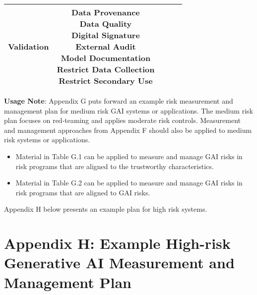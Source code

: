 \documentclass[fleqn]{article}
\begin{document}
\begin{landscape}
\begin{table}[H]
\begin{tabular}{|c|c|c|c|c|}
{			\textbullet\hspace{3pt} Validation\\ 	
		}
		& \makecell[l]{
			\textbullet\hspace{3pt} Data Provenance\\ 	
			\textbullet\hspace{3pt} Data Quality\\ 	
			\textbullet\hspace{3pt} Digital Signature\\ 	
			\textbullet\hspace{3pt} External Audit\\ 	
			\textbullet\hspace{3pt} Model Documentation \\ 
			\textbullet\hspace{3pt} Restrict Data Collection\\ 				
			\textbullet\hspace{3pt} Restrict Secondary Use\\ 							 	 
		} 
		\\
		\hline
	\end{tabular}
	\label{table:med_risk_plan_by_gai_risk_cont2}
\end{table}

\noindent\textbf{Usage Note}: Appendix G puts forward an example risk measurement and management plan for medium risk GAI systems or applications. The medium risk plan focuses on red-teaming and applies moderate risk controls. Measurement and management approaches from Appendix F should also be applied to medium risk systems or applications.

\begin{itemize}
	\item Material in Table G.1 can be applied to measure and manage GAI risks in risk programs that are aligned to the trustworthy characteristics. 
	\item Material in Table G.2 can be applied to measure and manage GAI risks in risk programs that are aligned to GAI risks. 
\end{itemize}

\noindent Appendix H below presents an example plan for high risk systems.  

\vfill
\raisebox{-10pt}{\makebox[\linewidth]{\thepage}}

\pagebreak
\thispagestyle{empty}

\section*{Appendix H: Example High-risk Generative AI Measurement and Management Plan}\label{sec:appndxh}


\end{landscape}
\end{document}
